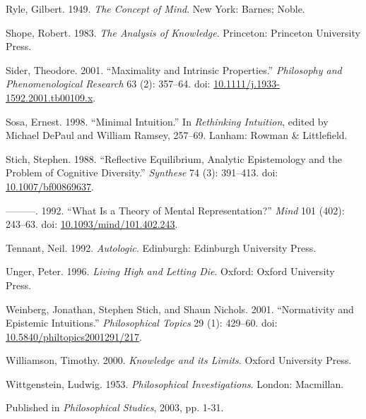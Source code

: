 \documentclass[
  10pt,
  letterpaper,
  DIV=11,
  numbers=noendperiod,
  twoside]{scrartcl}
\newlength{\cslhangindent}
\newenvironment{CSLReferences}[2] %
 {\begin{list}{}{%
  \setlength{\itemindent}{0pt}
  \setlength{\leftmargin}{0pt}
  \setlength{\parsep}{0pt}
  \ifodd #1
   \setlength{\leftmargin}{\cslhangindent}
   \setlength{\itemindent}{-1\cslhangindent}
  \fi
  \setlength{\itemsep}{#2\baselineskip}}}
 {\end{list}}
\begin{document}
\begin{CSLReferences}{1}{0}
Ryle, Gilbert. 1949. \emph{The Concept of Mind}. New York: Barnes;
Noble.

Shope, Robert. 1983. \emph{The Analysis of Knowledge}. Princeton:
Princeton University Press.

Sider, Theodore. 2001. {``{Maximality and Intrinsic Properties}.''}
\emph{Philosophy and Phenomenological Research} 63 (2): 357--64. doi:
\href{https://doi.org/10.1111/j.1933-1592.2001.tb00109.x}{10.1111/j.1933-1592.2001.tb00109.x}.

Sosa, Ernest. 1998. {``Minimal Intuition.''} In \emph{Rethinking
Intuition}, edited by Michael DePaul and William Ramsey, 257--69.
Lanham: Rowman \& Littlefield.

Stich, Stephen. 1988. {``Reflective Equilibrium, Analytic Epistemology
and the Problem of Cognitive Diversity.''} \emph{Synthese} 74 (3):
391--413. doi:
\href{https://doi.org/10.1007/bf00869637}{10.1007/bf00869637}.

---------. 1992. {``What Is a Theory of Mental Representation?''}
\emph{Mind} 101 (402): 243--63. doi:
\href{https://doi.org/10.1093/mind/101.402.243}{10.1093/mind/101.402.243}.

Tennant, Neil. 1992. \emph{Autologic}. Edinburgh: Edinburgh University
Press.

Unger, Peter. 1996. \emph{Living High and Letting Die}. Oxford: Oxford
University Press.

Weinberg, Jonathan, Stephen Stich, and Shaun Nichols. 2001.
{``Normativity and Epistemic Intuitions.''} \emph{Philosophical Topics}
29 (1): 429--60. doi:
\href{https://doi.org/10.5840/philtopics2001291/217}{10.5840/philtopics2001291/217}.

Williamson, Timothy. 2000. \emph{{Knowledge and its Limits}}. Oxford
University Press.

Wittgenstein, Ludwig. 1953. \emph{Philosophical Investigations}. London:
Macmillan.

\end{CSLReferences}



\noindent Published in\emph{
Philosophical Studies}, 2003, pp. 1-31.
\end{document}
